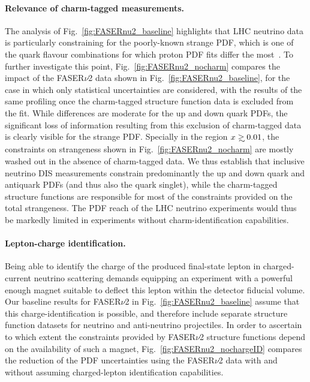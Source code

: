 
\paragraph{Relevance of charm-tagged measurements.}
%
The analysis of Fig.~\ref{fig:FASERnu2_baseline} highlights that LHC neutrino data is particularly
constraining for the poorly-known strange PDF, which is one of the quark flavour combinations
for which proton PDF fits differ the most~\cite{Faura:2020oom}.
%
To further investigate this point, Fig.~\ref{fig:FASERnu2_nocharm} compares the impact of the FASER$\nu$2 data shown in
Fig.~\ref{fig:FASERnu2_baseline}, for the case in which only statistical
uncertainties are considered, with the results of the same profiling once the charm-tagged
structure function data is excluded from the fit.
%
While differences are moderate for the up and down quark PDFs, the significant loss
of information resulting from this exclusion of charm-tagged data is clearly
visible for the strange PDF.
%
Specially in the region $x\gsim 0.01$, the constraints on strangeness shown in
Fig.~\ref{fig:FASERnu2_nocharm} are mostly washed out in the absence of charm-tagged data.
%
We thus establish that inclusive neutrino DIS measurements constrain predominantly
the up and down quark and antiquark PDFs (and thus also the quark singlet), while the charm-tagged
structure functions are responsible for most of the constraints provided on the total strangeness.
%
The PDF reach of the LHC neutrino experiments would thus be  markedly limited in experiments without
charm-identification capabilities.

\paragraph{Lepton-charge identification.}
%
Being able to identify the charge of the produced final-state lepton in charged-current
neutrino scattering demands equipping an experiment with a powerful enough magnet suitable to
deflect this lepton within the detector fiducial volume.
%
Our baseline results for FASER$\nu$2 in Fig.~\ref{fig:FASERnu2_baseline} assume that this charge-identification
is possible, and therefore include separate structure function datasets for neutrino and anti-neutrino projectiles.
%
In order to ascertain to which extent the constraints provided by FASER$\nu$2 structure functions
depend on the availability of such a magnet,
Fig.~\ref{fig:FASERnu2_nochargeID} compares the reduction of the PDF uncertainties using
the FASER$\nu$2 data with and without assuming charged-lepton identification capabilities.

